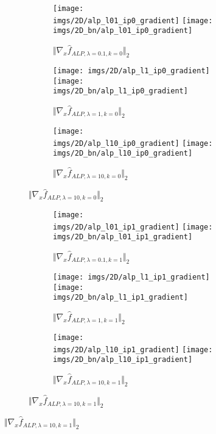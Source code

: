 \documentclass{article}
\begin{document}
\begin{figure}[h]
\begin{subfigure}{\linewidth}
\begin{subfigure}{.33\linewidth}
  \texttt{[image: imgs/2D/alp\_l01\_ip0\_gradient]}\hfill
  \texttt{[image: imgs/2D\_bn/alp\_l01\_ip0\_gradient]}
  \caption{$\Vert\nabla_x \hat{f}_{ALP, \lambda=0.1, k=0} \Vert_2$}
\end{subfigure}
\begin{subfigure}{.33\linewidth}
  \texttt{[image: imgs/2D/alp\_l1\_ip0\_gradient]}\hfill
  \texttt{[image: imgs/2D\_bn/alp\_l1\_ip0\_gradient]}
  \caption{$\Vert\nabla_x \hat{f}_{ALP, \lambda=1, k=0} \Vert_2$}
\end{subfigure}
\begin{subfigure}{.33\linewidth}
  \texttt{[image: imgs/2D/alp\_l10\_ip0\_gradient]}\hfill
  \texttt{[image: imgs/2D\_bn/alp\_l10\_ip0\_gradient]}
  \caption{$\Vert\nabla_x \hat{f}_{ALP, \lambda=10, k=0} \Vert_2$}
\end{subfigure}
\end{subfigure}\par

\begin{subfigure}{\linewidth}
\begin{subfigure}{.33\linewidth}
  \texttt{[image: imgs/2D/alp\_l01\_ip1\_gradient]}\hfill
  \texttt{[image: imgs/2D\_bn/alp\_l01\_ip1\_gradient]}
  \caption{$\Vert\nabla_x \hat{f}_{ALP, \lambda=0.1, k=1} \Vert_2$}
\end{subfigure}
\begin{subfigure}{.33\linewidth}
  \texttt{[image: imgs/2D/alp\_l1\_ip1\_gradient]}\hfill
  \texttt{[image: imgs/2D\_bn/alp\_l1\_ip1\_gradient]}
  \caption{$\Vert\nabla_x \hat{f}_{ALP, \lambda=1, k=1} \Vert_2$}
\end{subfigure}
\begin{subfigure}{.33\linewidth}
  \texttt{[image: imgs/2D/alp\_l10\_ip1\_gradient]}\hfill
  \texttt{[image: imgs/2D\_bn/alp\_l10\_ip1\_gradient]}
  \caption{$\Vert\nabla_x \hat{f}_{ALP, \lambda=10, k=1} \Vert_2$}
\end{subfigure}
\end{subfigure}\par


\end{figure}
\end{document}
